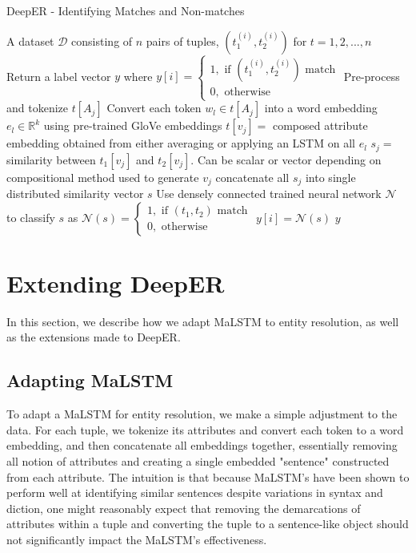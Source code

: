 \documentclass{proc}
\begin{document}
\begin{algorithm}
	\caption{DeepER - Identifying Matches and Non-matches}
	\begin{algorithmic}[1]
		\REQUIRE A dataset $\mathcal{D}$ consisting of $n$ pairs of tuples, $(t_{1}^{(i)}, t_{2}^{(i)})$ for $ t = 1, 2, ..., n$
		\ENSURE Return a label vector $y$ where $y[i] = \begin{cases} 1, \text{   if } (t_{1}^{(i)}, t_{2}^{(i)}) \text{ match} \\ 0, \text{   otherwise} \end{cases}$
				\STATE Pre-process and tokenize $t[A_j]$
				\STATE Convert each token $w_l \in t[A_j]$ into a word embedding $e_l \in \mathbb{R}^k$ using pre-trained GloVe embeddings
				\STATE $t[v_j] = $ composed attribute embedding obtained from either averaging or applying an LSTM on all $e_l$ 
			\ENDFOR
		\ENDFOR
				\STATE $s_j = $ similarity between $t_1[v_j]$ and $t_2[v_j]$. Can be scalar or vector depending on compositional method used to generate $v_j$
			\ENDFOR
			\STATE concatenate all $s_j$ into single distributed similarity vector $s$
			\STATE Use densely connected trained neural network $\mathcal{N}$ to classify $s$ as $\mathcal{N}(s) = \begin{cases} 1, \text{   if } (t_{1}, t_{2}) \text{ match} \\ 0, \text{   otherwise} \end{cases}$
			\STATE $y[i] = \mathcal{N}(s)$
		\ENDFOR
		\RETURN $y$
	\end{algorithmic}
\end{algorithm}

\section{Extending DeepER}

In this section, we describe how we adapt MaLSTM to entity resolution, as well as the extensions made to DeepER.

\subsection{Adapting MaLSTM}

To adapt a MaLSTM for entity resolution, we make a simple adjustment to the data. For each tuple, we tokenize its attributes and convert each token to a word embedding, and then concatenate all embeddings together, essentially removing all notion of attributes and creating a single embedded "sentence" constructed from each attribute. The intuition is that because MaLSTM's have been shown to perform well at identifying similar sentences despite variations in syntax and diction, one might reasonably expect that removing the demarcations of attributes within a tuple and converting the tuple to a sentence-like object should not significantly impact the MaLSTM's effectiveness.
\end{document}
